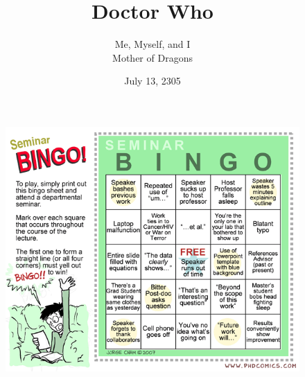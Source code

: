 \documentclass[compress]{beamer}
\title[SDAL]{\vspace{-0.85in}Doctor Who}
\author{Me, Myself, and I\\ \tiny{Mother of Dragons}}
\date[]{July 13, 2305}
\begin{document}





\begin{frame}[BlankLogo] \frametitle{}
    \begin{figure}
    \centering
    \includegraphics[height=0.9\textheight]{figures/phd040907s_bingo}
    \label{fig:phd040907sbingo}
    \end{figure}
\end{frame}
\end{document}
